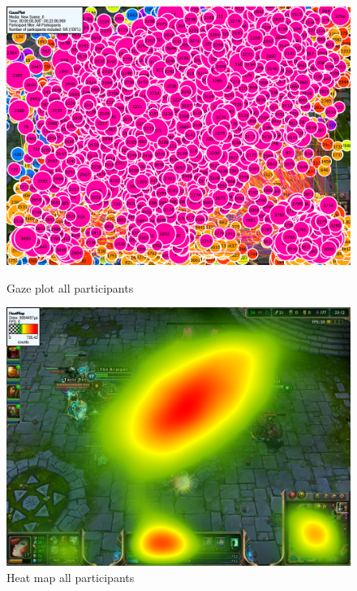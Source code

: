 \documentclass[notitlepage]{report}
\begin{document}
\begin{figure}[ht]
\begin{minipage}[b]{0.45\linewidth}
\centering
\includegraphics[width=\textwidth]{images/gazeplot/All}
\caption{Gaze plot all participants}
\label{gaze_all}
\end{minipage}
\hspace{0.5cm}
\begin{minipage}[b]{0.45\linewidth}
\centering
\includegraphics[width=\textwidth]{images/heatmap/All}
\caption{Heat map all participants}
\label{heat_all}
\end{minipage}
\end{figure}
\end{document}
